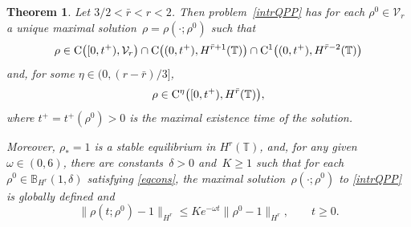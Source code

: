 \documentclass[reqno,11pt]{amsart}
\numberwithin{equation}{section}
\newcommand{\R}{\mathbb{R}}
\newcommand{\bT}{\mathbb{T}}
\newtheorem{thm}{Theorem}[section]
\theoremstyle{remark}
\begin{document}
\begin{thm}\label{T:Ex2}
Let $3/2<\bar r<r<2$. Then problem~\eqref{intrQPP} has for each  $\rho^0\in \mathcal{V}_{r}$
 a unique maximal solution~$\rho=\rho(\cdot;\rho^0) $ such that 
\begin{equation}\label{prop1}
\rho\in {\rm C}\big([0,t^+),\mathcal{V}_{r}\big)\cap {\rm C}\big((0,t^+), H^{\bar r+1}(\bT)\big) \cap {\rm C}^1\big((0,t^+), H^{\bar r-2}(\bT)\big)
\end{equation}
and, for some $\eta\in(0,(r-\bar r)/3]$,
\begin{equation}\label{prop1'}
\rho\in{\rm C}^{\eta}\big([0,t^+), H^{\bar r}(\bT)\big),
\end{equation}
where $t^+=t^+(\rho^0)>0$ is the maximal existence time of the solution.

Moreover, $\rho_*=1$ is a stable equilibrium in $ H^{r}(\bT)$, and, for any  given $\omega\in (0,6)$, there are constants~$\delta>0$  and~${K\geq 1}$ such that for each $\rho^0\in\mathbb{B}_{H^r}(1,\delta)$ 
 satisfying  \eqref{eqcons},  the maximal solution~$\rho(\cdot;\rho^0)$  to \eqref{intrQPP} is globally  defined and
\begin{equation}\label{convEx2}
\|\rho(t;\rho^0)-1\|_{H^{{ r}}}\leq Ke^{-\omega t}\|\rho^0-1\|_{H^{{r}}},\qquad t\geq0.
\end{equation}
\end{thm}

\end{document}
